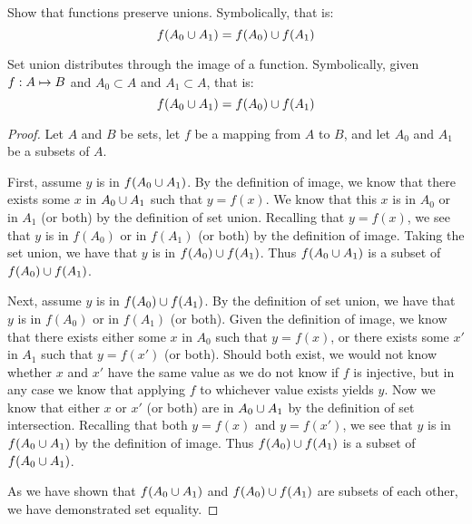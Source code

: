 \documentclass[main.tex]{subfiles}
\begin{document}
\subproblem{}\label{s2p2f}

Show that functions preserve unions. Symbolically, that is:
\[f(A_0 \cup A_1) = f(A_0) \cup f(A_1)\]

\begin{thm}
	Set union distributes through the image of a function. Symbolically,
	given \({f}: {A} \mapsto{} {B}\) and \(A_0 \subset A\) and \(A_1 \subset A\),
	that is:
	\[f(A_0 \cup A_1) = f(A_0) \cup f(A_1)\]
\end{thm}
\begin{proof}
	Let \(A\) and \(B\) be sets, let \(f\) be a mapping from \(A\) to \(B\),
	and let \(A_0\) and \(A_1\) be a subsets of \(A\).

	First, assume \(y\) is in \(f(A_0 \cup A_1)\). By the definition of
	image, we know that there exists some \(x\) in \(A_0 \cup A_1\) such
	that \(y = f(x)\). We know that this \(x\) is in \(A_0\) or in \(A_1\)
	(or both) by the definition of set union. Recalling that \(y = f(x)\),
	we see that \(y\) is in \(f(A_0)\) or in \(f(A_1)\) (or both) by the
	definition of image. Taking the set union, we have that \(y\) is in
	\(f(A_0) \cup f(A_1)\). Thus \(f(A_0 \cup A_1)\) is a subset of
	\(f(A_0) \cup f(A_1)\).

	Next, assume \(y\) is in \(f(A_0) \cup f(A_1)\). By the definition of
	set union, we have that \(y\) is in \(f(A_0)\) or in \(f(A_1)\) (or
	both). Given the definition of image, we know that there exists either
	some \(x\) in \(A_0\) such that \(y = f(x)\), or there exists some
	\(x'\) in \(A_1\) such that \(y = f(x')\) (or both). Should both exist,
	we would not know whether \(x\) and \(x'\) have the same value as we
	do not know if \(f\) is injective, but in any case we know that applying
	\(f\) to whichever value exists yields \(y\). Now we know that either
	\(x\) or \(x'\) (or both) are in \(A_0 \cup A_1\) by the definition of
	set intersection. Recalling that both \(y = f(x)\) and \(y = f(x')\), we
	see that \(y\) is in \(f(A_0 \cup A_1)\) by the definition of image.
	Thus \(f(A_0) \cup f(A_1)\) is a subset of \(f(A_0 \cup A_1)\).

	As we have shown that \(f(A_0 \cup A_1)\) and \(f(A_0) \cup f(A_1)\)
	are subsets of each other, we have demonstrated set equality.
\end{proof}
\end{document}
